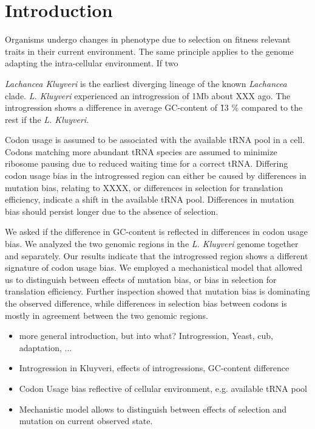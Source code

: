 \documentclass[12pt,draft]{article}
\begin{document}
\doublespacing
\linenumbers


\section*{Introduction}

Organisms undergo changes in phenotype due to selection on fitness relevant traits in their current environment. 
The same principle applies to the genome adapting the intra-cellular environment.
If two 

\textit{Lachancea Kluyveri} is the earliest diverging lineage of the known \textit{Lachancea} clade. 
\textit{L. Kluyveri} experienced an introgression of 1Mb about XXX ago. 
The introgression shows a difference in average GC-content of \~ 13 \% compared to the rest if the \textit{L. Kluyveri}.

Codon usage is assumed to be associated with the available tRNA pool in a cell. 
Codons matching more abundant tRNA species are assumed to minimize ribosome pausing due to reduced waiting time for a correct tRNA. 
Differing codon usage bias in the introgressed region can either be caused by differences in mutation bias, relating to XXXX, or differences in selection for translation efficiency, indicate a shift in the available tRNA pool.
Differences in mutation bias should persist longer due to the absence of selection.   

We asked if the difference in GC-content is reflected in differences in codon usage bias.
We analyzed the two genomic regions in the \textit{L. Kluyveri} genome together and separately.
Our results indicate that the introgressed region shows a different signature of codon usage bias.
We employed a mechanistical model that allowed us to distinguish between effects of mutation bias, or bias in selection for translation efficiency.
Further inspection showed that mutation bias is dominating the observed difference, while differences in selection bias between codons is mostly in agreement between the two genomic regions. 

\begin{itemize}
	\item more general introduction, but into what? Introgression, Yeast, cub, adaptation, ...
	\item Introgression in Kluyveri, effects of introgressions, GC-content difference
	\item Codon Usage bias reflective of cellular environment, e.g. available tRNA pool
	\item Mechanistic model allows to distinguish between effects of selection and mutation on current observed state.
\end{itemize}
	
\end{document}
